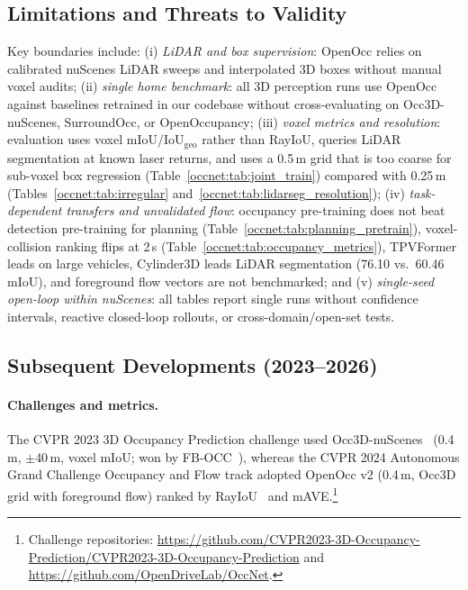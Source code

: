 \subsection{Limitations and Threats to Validity}\label{occnet:sec:limitations}

Key boundaries include: (i) \emph{LiDAR and box supervision}: OpenOcc relies on calibrated nuScenes LiDAR sweeps and interpolated 3D boxes without manual voxel audits; (ii) \emph{single home benchmark}: all 3D perception runs use OpenOcc against baselines retrained in our codebase without cross-evaluating on Occ3D-nuScenes, SurroundOcc, or OpenOccupancy; (iii) \emph{voxel metrics and resolution}: evaluation uses voxel mIoU/$\text{IoU}_{\text{geo}}$ rather than RayIoU, queries LiDAR segmentation at known laser returns, and uses a 0.5\,m grid that is too coarse for sub-voxel box regression (Table~\ref{occnet:tab:joint_train}) compared with 0.25\,m (Tables~\ref{occnet:tab:irregular} and~\ref{occnet:tab:lidarseg_resolution}); (iv) \emph{task-dependent transfers and unvalidated flow}: occupancy pre-training does not beat detection pre-training for planning (Table~\ref{occnet:tab:planning_pretrain}), voxel-collision ranking flips at 2\,s (Table~\ref{occnet:tab:occupancy_metrics}), TPVFormer leads on large vehicles, Cylinder3D leads LiDAR segmentation (76.10 vs.\ 60.46 mIoU), and foreground flow vectors are not benchmarked; and (v) \emph{single-seed open-loop within nuScenes}: all tables report single runs without confidence intervals, reactive closed-loop rollouts, or cross-domain/open-set tests.

\subsection{Subsequent Developments (2023--2026)}\label{occnet:sec:subsequent}

\paragraph{Challenges and metrics.} The CVPR 2023 3D Occupancy Prediction challenge used Occ3D-nuScenes~\cite{tian2023occ3d} (0.4\,m, $\pm$40\,m, voxel mIoU; won by FB-OCC~\cite{li2023fbocc}), whereas the CVPR 2024 Autonomous Grand Challenge Occupancy and Flow track adopted OpenOcc v2 (0.4\,m, Occ3D grid with foreground flow) ranked by RayIoU~\cite{liu2024sparseocc} and mAVE.\footnote{\sloppy Challenge repositories: \url{https://github.com/CVPR2023-3D-Occupancy-Prediction/CVPR2023-3D-Occupancy-Prediction} and \url{https://github.com/OpenDriveLab/OccNet}.}

